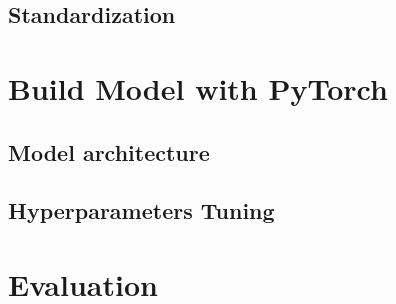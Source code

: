 \documentclass[12pt,twoside]{report}
\begin{document}
\subsection{Standardization}

\section{Build Model with PyTorch}
\subsection{Model architecture}
\subsection{Hyperparameters Tuning}

\section{Evaluation}








\end{document}
